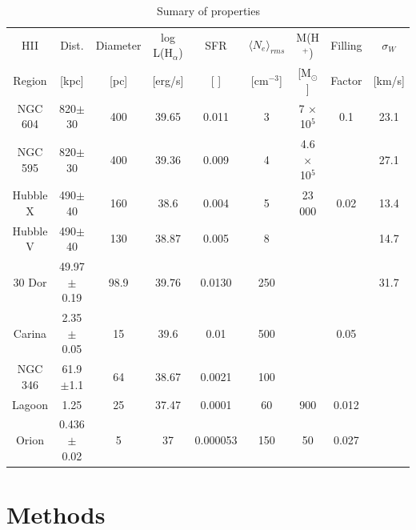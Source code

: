 \documentclass[fleqn,usenatbib, useAMS, a4paper]{mnras}
\begin{document}
\begin{table}
\begin{center}\caption{Sumary of properties \citep{1984ApJ...287..116K} \citep{1986ApJ...300..624R}}
\begin{tabular}{ccccccccc}\hline
HII    &  Dist.  & Diameter & log L(H$_{\alpha}$) & SFR      &  $ \langle N_{e} \rangle_{rms}$    & M(H$^{+}$) & Filling & \(\sigma_{W}\) \\
Region     &  [kpc] &  [pc]     &  [erg/s]            & [ ]      & [cm$^{-3}$] & [M$_{\odot}$] & Factor & [km/s] \\ \hline
NGC 604 &820$\pm$30  & 400    &   39.65    & 0.011 & 3  & 7 $\times$ 10$^{5}$ & 0.1 & 23.1 \\
NGC 595 &820$\pm$30  & 400    &   39.36    & 0.009 & 4  & 4.6 $\times$ 10$^{5}$ & & 27.1 \\
Hubble X  &   490$\pm$40  & 160     &    38.6      &  0.004   &  5 & 23 000& 0.02 & 13.4 \\
Hubble V  &   490$\pm$40  & 130     &    38.87     &  0.005   &  8 &    & & 14.7 \\
30 Dor    &   49.97$\pm$0.19    & 98.9    &    39.76     & 0.0130   & 250&    & & 31.7 \\
Carina    &   2.35$\pm$0.05  & 15      &    39.6      & 0.01     & 500&    & 0.05 & \\
NGC 346   &   61.9$\pm$1.1 & 64      &    38.67     & 0.0021   & 100&    &     & \\
Lagoon    &   1.25 & 25      &    37.47     & 0.0001   &  60& 900& 0.012 & \\
Orion     &   0.436$\pm$0.02  & 5       &    37        & 0.000053 & 150& 50 & 0.027 & \\\hline
\end{tabular}\label{tab:Reg}
\end{center}
\end{table} 



\section{Methods}\label{sec:met}

\end{document}
